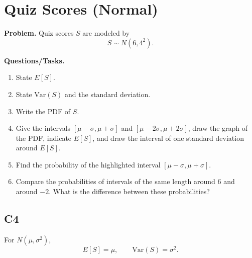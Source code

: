 \section{Quiz Scores (Normal)}

\textbf{Problem.}
Quiz scores \(S\) are modeled by
\[
S\sim N(6,4^2).
\]

\textbf{Questions/Tasks.}
\begin{enumerate}[label=\textbf{\alph*)}]
	\item State \(E[S]\).
	\item State \(\mathrm{Var}(S)\) and the standard deviation.
	\item Write the PDF of \(S\).
	\item Give the intervals \([\mu-\sigma,\mu+\sigma]\) and \([\mu-2\sigma,\mu+2\sigma]\), draw the graph of the PDF, indicate \(E[S]\), and draw the interval of one standard deviation around \(E[S]\).
	\item Find the probability of the highlighted interval \([\mu-\sigma,\mu+\sigma]\).
	\item Compare the probabilities of intervals of the same length around \(6\) and around \(-2\). What is the difference between these probabilities?
\end{enumerate}

\subsection*{C4}
For \(N(\mu,\sigma^2)\),
\[
E[S]=\mu,
\qquad
\mathrm{Var}(S)=\sigma^2.
\]

